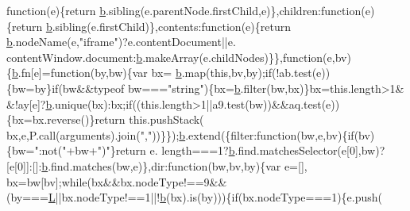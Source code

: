 \begin{DoxyCode}
{      function}(e)\{\textcolor{keywordflow}{return} \hyperlink{docs_2_programmer's_manual_2html_2jquery_8js_aa4026ad5544b958e54ce5e106fa1c805}{b}.sibling(e.parentNode.firstChild,e)\},children:\textcolor{keyword}{function}(e)\{\textcolor{keywordflow}{return} 
      \hyperlink{docs_2_programmer's_manual_2html_2jquery_8js_aa4026ad5544b958e54ce5e106fa1c805}{b}.sibling(e.firstChild)\},contents:\textcolor{keyword}{function}(e)\{\textcolor{keywordflow}{return} \hyperlink{docs_2_programmer's_manual_2html_2jquery_8js_aa4026ad5544b958e54ce5e106fa1c805}{b}.nodeName(e,\textcolor{stringliteral}{"iframe"})?e.contentDocument||e.
      contentWindow.document:\hyperlink{docs_2_programmer's_manual_2html_2jquery_8js_aa4026ad5544b958e54ce5e106fa1c805}{b}.makeArray(e.childNodes)\}\},\textcolor{keyword}{function}(e,bv)\{\hyperlink{docs_2_programmer's_manual_2html_2jquery_8js_aa4026ad5544b958e54ce5e106fa1c805}{b}.fn[e]=\textcolor{keyword}{function}(by,bw)\{var bx=
      \hyperlink{docs_2_programmer's_manual_2html_2jquery_8js_aa4026ad5544b958e54ce5e106fa1c805}{b}.map(\textcolor{keyword}{this},bv,by);\textcolor{keywordflow}{if}(!ab.test(e))\{bw=by\}\textcolor{keywordflow}{if}(bw&&typeof bw===\textcolor{stringliteral}{"string"})\{bx=\hyperlink{docs_2_programmer's_manual_2html_2jquery_8js_aa4026ad5544b958e54ce5e106fa1c805}{b}.filter(bw,bx)\}bx=this.length>1&
      &!ay[e]?\hyperlink{docs_2_programmer's_manual_2html_2jquery_8js_aa4026ad5544b958e54ce5e106fa1c805}{b}.unique(bx):bx;\textcolor{keywordflow}{if}((this.length>1||a9.test(bw))&&aq.test(e))\{bx=bx.reverse()\}\textcolor{keywordflow}{return} this.pushStack(
      bx,e,P.call(arguments).join(\textcolor{stringliteral}{","}))\}\});\hyperlink{docs_2_programmer's_manual_2html_2jquery_8js_aa4026ad5544b958e54ce5e106fa1c805}{b}.extend(\{filter:\textcolor{keyword}{function}(bw,e,bv)\{\textcolor{keywordflow}{if}(bv)\{bw=\textcolor{stringliteral}{":not("}+bw+\textcolor{stringliteral}{")"}\}\textcolor{keywordflow}{return} e.
      length===1?\hyperlink{docs_2_programmer's_manual_2html_2jquery_8js_aa4026ad5544b958e54ce5e106fa1c805}{b}.find.matchesSelector(e[0],bw)?[e[0]]:[]:\hyperlink{docs_2_programmer's_manual_2html_2jquery_8js_aa4026ad5544b958e54ce5e106fa1c805}{b}.find.matches(bw,e)\},dir:\textcolor{keyword}{function}(bw,bv,by)\{var e=[],
      bx=bw[bv];\textcolor{keywordflow}{while}(bx&&bx.nodeType!==9&&(by===\hyperlink{docs_2_programmer's_manual_2html_2jquery_8js_a38ee4c0b5f4fe2a18d0c783af540d253}{L}||bx.nodeType!==1||!\hyperlink{docs_2_programmer's_manual_2html_2jquery_8js_aa4026ad5544b958e54ce5e106fa1c805}{b}(bx).is(by)))\{\textcolor{keywordflow}{if}(bx.nodeType===1)\{e.push(

\end{DoxyCode}
